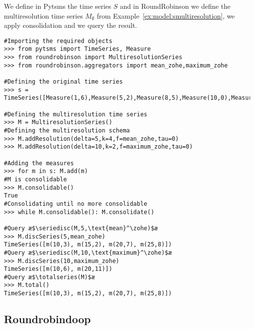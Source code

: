 \begin{example}
  We define in Pytsms the time series $S$ and in RoundRobinson we
  define the multiresolution time series $M_\emptyset$ from
  Example~\ref{ex:model:smultiresolution}, we apply consolidation and
  we query the result.

\begin{lstlisting}[style=py]
#Importing the required objects
>>> from pytsms import TimeSeries, Measure
>>> from roundrobinson import MultiresolutionSeries
>>> from roundrobinson.aggregators import mean_zohe,maximum_zohe

#Defining the original time series
>>> s = TimeSeries([Measure(1,6),Measure(5,2),Measure(8,5),Measure(10,0),Measure(14,1),Measure(19,6),Measure(22,11),Measure(26,6),Measure(29,0)])

#Defining the multiresolution time series
>>> M = MultiresolutionSeries()
#Defining the multiresolution schema
>>> M.addResolution(delta=5,k=4,f=mean_zohe,tau=0)
>>> M.addResolution(delta=10,k=2,f=maximum_zohe,tau=0)

#Adding the measures
>>> for m in s: M.add(m)
#M is consolidable
>>> M.consolidable()
True
#Consolidating until no more consolidable
>>> while M.consolidable(): M.consolidate()

#Query æ$\seriedisc(M,5,\text{mean}^\zohe)$æ
>>> M.discSeries(5,mean_zohe)
TimeSeries([m(10,3), m(15,2), m(20,7), m(25,8)])
#Query æ$\seriedisc(M,10,\text{maximum}^\zohe)$æ
>>> M.discSeries(10,maximum_zohe)
TimeSeries([m(10,6), m(20,11)])
#Query æ$\totalseries(M)$æ
>>> M.total()
TimeSeries([m(10,3), m(15,2), m(20,7), m(25,8)])
\end{lstlisting}
\end{example}



\subsection{Roundrobindoop}

\todo{}



